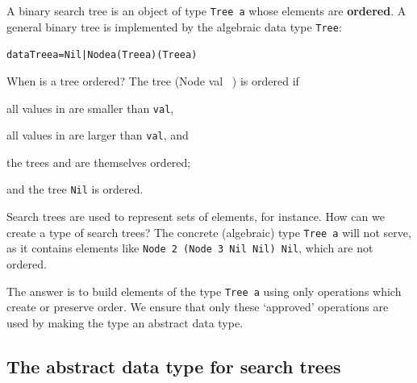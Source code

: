 A binary search tree is an object of type \texttt{Tree a} whose elements are
\textbf{ordered}.  A general binary tree is implemented by the algebraic
data type \texttt{Tree}:
\begin{alltt}
data Tree a = Nil | Node a (Tree a) (Tree a)
\end{alltt}
When is a tree ordered?
The tree {\mi(Node val \tone\ \ttwo)} is ordered if 
\begin{titemize}
\item all values in \texttt{\tone} are
smaller than \texttt{val},  
\item all values in \texttt{\ttwo} are larger than \texttt{val}, and
\item the trees \texttt{\tone} and \texttt{\ttwo} are themselves ordered;
\end{titemize}
and the tree \texttt{Nil} is ordered.

Search trees are used to represent sets of elements, for instance. How can we
create a type of search trees? The concrete (algebraic) type \texttt{Tree a} will not serve, as it
contains elements like \texttt{Node 2 (Node 3 Nil Nil) Nil}, which are not
ordered.

The answer is to build elements of the type \texttt{Tree a}
using only operations which create
or preserve order. We ensure that only these `approved' operations are used
by making the type an abstract data type. 

\subsection*{The abstract data type for search trees}

